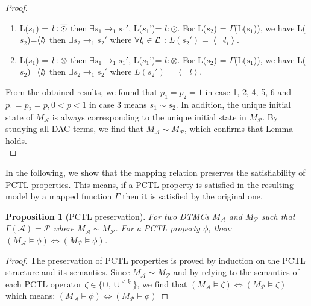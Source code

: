 \documentclass[3p,times,procedia,authoryear,round]{elsarticle}
\begin{document}
\begin{proof}
\begin{enumerate}
\item L($s_{1}$) = $\emph{l} : \overline{\odot} $ then $\exists s_{1} \rightarrow_{1} s_{1}'$, L($s_{1}$')= $l :\odot$. For L($s_{2}$) = $\Gamma$(L($s_{1}$)), we have L($s_{2}$)=$ \left\langle \emph{l} \right\rangle$ then $\exists s_{2} \rightarrow_{1} s_{2}'$ where $ \forall \emph{l}_{i} \in \mathcal{L}$ : $L(s_{2}') = \left\langle \neg l_{i}\right\rangle$.
	
\item L($s_{1}$) = $\emph{l} : \overline{\otimes} $ then $\exists s_{1} \rightarrow_{1} s_{1}'$, L($s_{1}$')= $l :\otimes$. For L($s_{2}$) = $\Gamma$(L($s_{1}$)), we have L($s_{2}$)=$ \left\langle \emph{l} \right\rangle$ then $\exists s_{2} \rightarrow_{1} s_{2}'$ where $L(s_{2}') = \left\langle \neg l\right\rangle$.
	
\end{enumerate}




From the obtained results, we found that $p_{1}=p_{2}= 1$  in case 1, 2, 4, 5, 6 and $p_{1}=p_{2}= p,  0<p<1$ in case 3  means   $s_{1} \sim s_{2} $. In addition, the unique initial state of $M_{\mathscr{A}}$ is always corresponding to the unique initial state in $M_{\mathscr{P}}$. By studying all DAC terms, we find that $M_{\mathscr{A}}\sim M_{\mathscr{P}}$, which confirms that Lemma holds.\\

\end{proof}

In the following, we show that the mapping relation preserves the satisfiability of PCTL properties. This means, if a PCTL property is satisfied in the resulting model by a mapped function $\Gamma$ then it is satisfied by the original one.\\

\newtheorem*{prop}{Proposition}
\begin{prop} [PCTL preservation] For two DTMCs $M_{\mathscr{A}}$ and $M_{\mathscr{P}}$ such that $\Gamma(\mathscr{A})= \mathscr{P}$ where $M_{\mathscr{A}}\sim M_{\mathscr{P}}$. For a PCTL property $\phi$, then: $(M_{\mathscr{A}} \vDash \phi) \Longleftrightarrow (M_{\mathscr{P}} \vDash \phi)$.\\
\end{prop}

\begin{proof}

The preservation of PCTL properties is proved by induction on the PCTL structure and its semantics. Since $M_{\mathscr{A}}\sim M_{\mathscr{P}}$ and by relying to the semantics of each PCTL operator $\zeta \in \{\cup, \cup^{\leq k}\} $, we find that $(M_{\mathscr{A}} \vDash \zeta) \Longleftrightarrow (M_{\mathscr{P}} \vDash \zeta)$ which means: $(M_{\mathscr{A}} \vDash \phi) \Longleftrightarrow (M_{\mathscr{P}} \vDash \phi)$ 
\end{proof}
\end{document}
